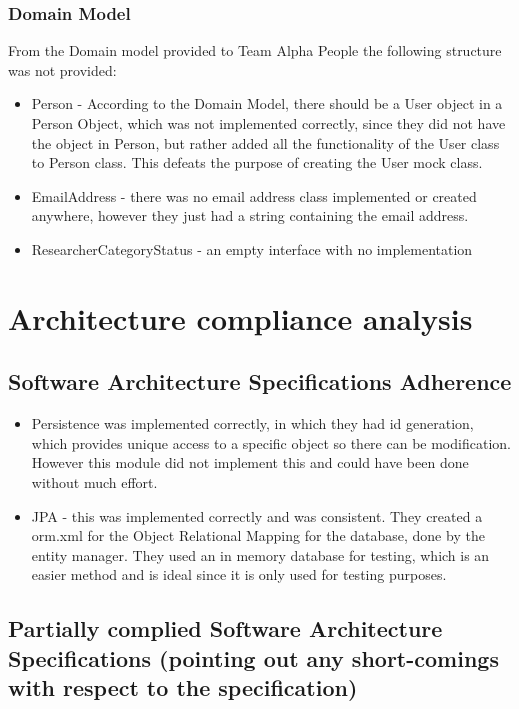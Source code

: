 \documentclass{article}
\begin{document}
	\subsubsection{Domain Model}
	From the Domain model provided to Team Alpha People the following structure was not provided:
	\begin{itemize}
		\item Person - According to the Domain Model, there should be a User object in a Person Object, which was not implemented correctly, since they did not have the object in Person, but rather added all the functionality of the User class to Person class. This defeats the purpose of creating the User mock class.
	\item EmailAddress - there was no email address class implemented or created anywhere, however they just had a string containing the email address.
	\item ResearcherCategoryStatus - an empty interface with no implementation
	\end{itemize}
	\newpage
	\section{Architecture compliance analysis}
	\subsection{Software Architecture Specifications Adherence}
	\begin{itemize}
		
		\item Persistence was implemented correctly, in which they had id generation, which provides unique access to a specific object so there can be modification. However this module did not implement this and could have been done without much effort. 
	\item JPA - this was implemented correctly and was consistent. They created a orm.xml for the Object Relational Mapping for the database, done by the entity manager. They used an in memory database for testing, which is an easier method and is ideal since it is only used for testing purposes.
	
	\end{itemize}
	
	\subsection{Partially complied Software Architecture Specifications (pointing out any short-comings with respect to the specification)}
	
\end{document}
